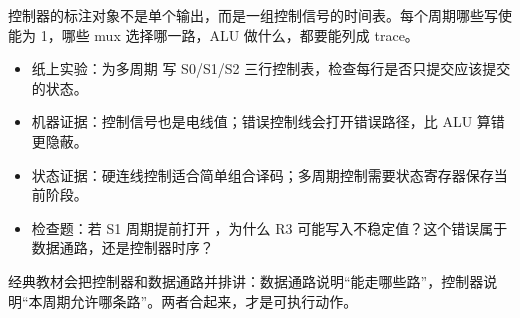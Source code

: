 \begin{classicnote}
控制器的标注对象不是单个输出，而是一组控制信号的时间表。每个周期哪些写使能为 1，哪些 mux 选择哪一路，ALU 做什么，都要能列成 trace。

\begin{itemize}
\item 纸上实验：为多周期  写 S0/S1/S2 三行控制表，检查每行是否只提交应该提交的状态。
\item 机器证据：控制信号也是电线值；错误控制线会打开错误路径，比 ALU 算错更隐蔽。
\item 状态证据：硬连线控制适合简单组合译码；多周期控制需要状态寄存器保存当前阶段。
\item 检查题：若 S1 周期提前打开 ，为什么 R3 可能写入不稳定值？这个错误属于数据通路，还是控制器时序？
\end{itemize}

经典教材会把控制器和数据通路并排讲：数据通路说明“能走哪些路”，控制器说明“本周期允许哪条路”。两者合起来，才是可执行动作。
\end{classicnote}
